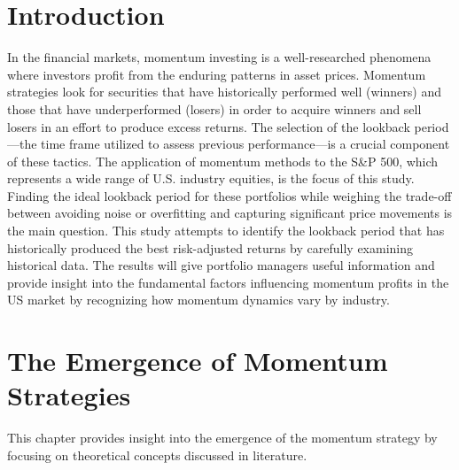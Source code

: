 \documentclass[11pt,a4paper,english,oneside]{book}
\begin{document}
\chapter{Introduction}
In the financial markets, momentum investing is a well-researched phenomena where investors profit from the enduring patterns in asset prices. Momentum strategies look for securities that have historically performed well (winners) and those that have underperformed (losers) in order to acquire winners and sell losers in an effort to produce excess returns. The selection of the lookback period—the time frame utilized to assess previous performance—is a crucial component of these tactics.
The application of momentum methods to the S\&P 500, which represents a wide range of U.S. industry equities, is the focus of this study. Finding the ideal lookback period for these portfolios while weighing the trade-off between avoiding noise or overfitting and capturing significant price movements is the main question.
This study attempts to identify the lookback period that has historically produced the best risk-adjusted returns by carefully examining historical data. The results will give portfolio managers useful information and provide insight into the fundamental factors influencing momentum profits in the US market by recognizing how momentum dynamics vary by industry.

\chapter{The Emergence of Momentum Strategies}
\label{sec: Momentum Phenomena}
This chapter provides insight into the emergence of the momentum strategy by focusing on theoretical concepts discussed in literature. 
\end{document}
